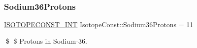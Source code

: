 \subsubsection{\texorpdfstring{Sodium36\+Protons}{Sodium36Protons}}
{\footnotesize\ttfamily \mbox{\hyperlink{group___isotope_const-_macros_ga5f18360b3e99483a35c32d789e62621c}{I\+S\+O\+T\+O\+P\+E\+C\+O\+N\+S\+T\+\_\+\+I\+NT}} Isotope\+Const\+::\+Sodium36\+Protons = 11}

\$ \$ Protons in Sodium-\/36. 